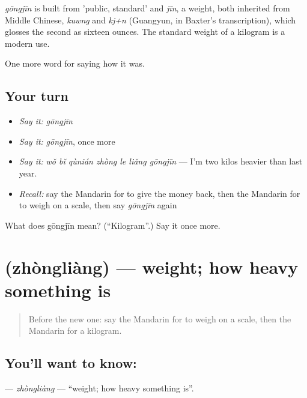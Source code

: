 \begin{cousinweb}
\emph{gōngjīn} is built from  'public, standard' and \emph{jīn}, a weight, both inherited from Middle Chinese, \emph{kuwng} and \emph{kj+n} (Guangyun, in Baxter's transcription), which glosses the second as sixteen ounces. The standard weight of a kilogram is a modern use.
\end{cousinweb}

\begin{grammarlens}[title={What you've built}]
One more word for saying how it was.
\end{grammarlens}

\subsection*{Your turn}
\begin{itemize}
\raggedright
  \item \emph{Say it:} \emph{gōngjīn}
  \item \emph{Say it:} \emph{gōngjīn}, once more
  \item \emph{Say it:} \emph{wǒ bǐ qùnián zhòng le liǎng gōngjīn} — I'm two kilos heavier than last year.
  \item \emph{Recall:} say the Mandarin for to give the money back, then the Mandarin for to weigh on a scale, then say \emph{gōngjīn} again
\end{itemize}

\begin{tcolorbox}[breakable,colback=teal!4,colframe=teal!35!black,title={Before you move on}]
What does gōngjīn mean? (\textquotedblleft{}Kilogram\textquotedblright{}.) Say it once more.
\end{tcolorbox}
\section[\texorpdfstring{\zh{重量} (zhòngliàng)}{重量 (zhòngliàng)}]{ (zhòngliàng) — weight; how heavy something is}

\label{lesson:ZH-C526-zhongliang}



\begin{quote}
Before the new one: say the Mandarin for to weigh on a scale, then the Mandarin for a kilogram.
\end{quote}

\subsection*{You'll want to know: }
\textbf{} — \emph{zhòngliàng} — \textquotedblleft{}weight; how heavy something is\textquotedblright{}.

